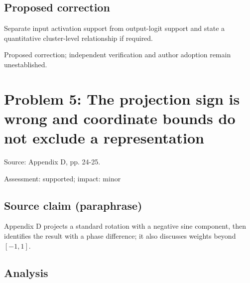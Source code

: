 \documentclass[11pt]{article}
\begin{document}
\subsection*{Proposed correction}

Separate input activation support from output-logit support and state a quantitative cluster-level relationship if required.

Proposed correction; independent verification and author adoption remain unestablished.

\section*{Problem 5: The projection sign is wrong and coordinate bounds do not exclude a representation}

Source: Appendix D, pp. 24-25.

Assessment: supported; impact: minor

\subsection*{Source claim (paraphrase)}

Appendix D projects a standard rotation with a negative sine component, then identifies the result with a phase difference; it also discusses weights beyond \([-1,1]\).

\subsection*{Analysis}
\end{document}
